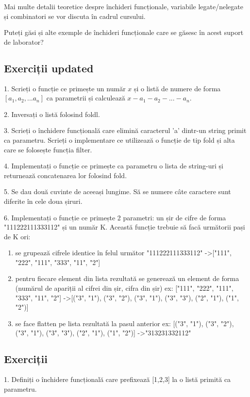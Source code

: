 Mai multe detalii teoretice despre închideri funcționale, variabile legate/nelegate și combinatori se vor discuta în cadrul cursului.

\begin{tcolorbox}[colback=cyan!5, colframe=cyan!10, breakable]
Puteți găsi și alte exemple de închideri funcționale care se găsesc în acest suport de laborator?
\end{tcolorbox}
\subsection*{ Exerciții updated }
1. Scrieți o funcție ce primește un număr $ x$ și o listă de numere de forma $ [a_1, a_2, ... a_n]$ ca parametrii și calculează $ x - a_1 - a_2 - ... - a_n$.

2. Inversați o listă folosind foldl.

3. Scrieți o închidere funcțională care elimină caracterul 'a' dintr-un string primit ca parametru. Scrieți o implementare ce utilizează o funcție de tip fold și alta care se folosește funcția filter.

4. Implementați o funcție ce primește ca parametru o lista de string-uri și returnează concatenarea lor folosind fold.

5. Se dau două cuvinte de aceeași lungime. Să se numere câte caractere sunt diferite în cele doua șiruri.

6. Implementați o funcție ce primește 2 parametri: un șir de cifre de forma "111222111333112" și un număr K. Această funcție trebuie să facă următorii pași de K ori:
\begin{enumerate}
	\item  se grupează cifrele identice în felul următor "111222111333112" -\textgreater  ["111", "222", "111", "333", "11", "2"]
	\item  pentru fiecare element din lista rezultată se generează un element de forma (numărul de apariții al cifrei din șir, cifra din șir) ex:  ["111", "222", "111", "333", "11", "2"] -\textgreater  [("3", "1"), ("3", "2"), ("3", "1"), ("3", "3"), ("2", "1"), ("1", "2")]
	\item  se face flatten pe lista rezultată la pasul anterior ex: [("3", "1"), ("3", "2"), ("3", "1"), ("3", "3"), ("2", "1"), ("1", "2")] -\textgreater   "313231332112"
\end{enumerate}

\subsection*{ Exerciții}
1. Definiți o închidere funcțională care prefixează [1,2,3] la o listă primită ca parametru.

